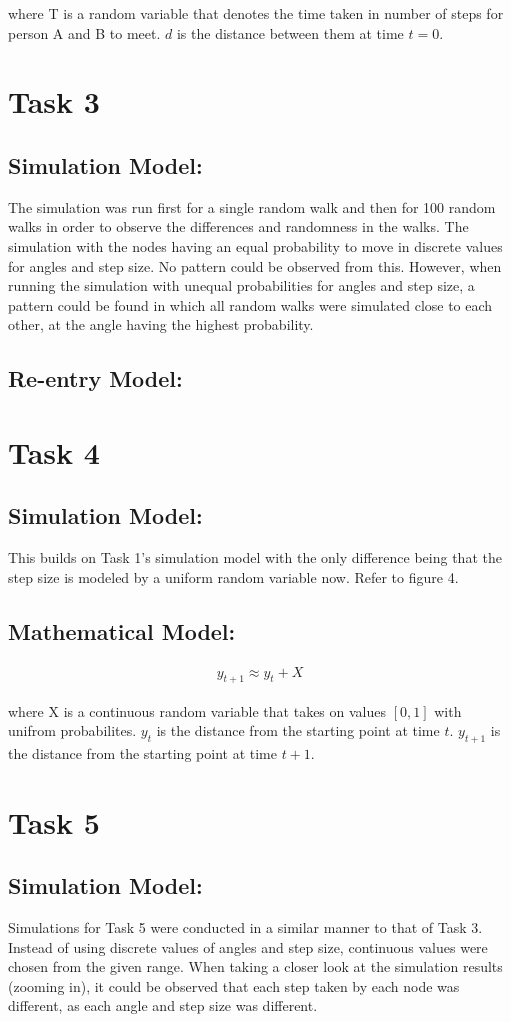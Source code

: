 \documentclass[8pt]{extarticle}
\begin{document}
where T is a random variable that denotes the time taken in number of steps for person A and B to meet.
$d$ is the distance between them at time $t = 0$.


\section*{Task 3}
\subsection*{Simulation Model:}
The simulation was run first for a single random walk and then for 100 random walks in order to observe the differences and randomness in the walks. The simulation with the nodes having an equal probability to move in discrete values for angles and step size. No pattern could be observed from this. However, when running the simulation with unequal probabilities for angles and step size, a pattern could be found in which all random walks were simulated close to each other, at the angle having the highest probability.

\subsection*{Re-entry Model:}


\section*{Task 4}
\subsection*{Simulation Model:}
This builds on Task 1's simulation model with the only difference being that the step size is modeled by a uniform random variable now.
Refer to figure 4.

\subsection*{Mathematical Model:}
\begin{align*}
    y_{t+1} \approx y_{t} + X
\end{align*}

where X is a continuous random variable that takes on values $[0, 1]$ with unifrom probabilites.
$y_t$ is the distance from the starting point at time $t$. $y_{t+1}$ is the distance from the starting point at time $t+1$.


\section*{Task 5}
\subsection*{Simulation Model:}
Simulations for Task 5 were conducted in a similar manner to that of Task 3. Instead of using discrete values of angles and step size, continuous values were chosen from the given range. When taking a closer look at the simulation results (zooming in), it could be observed that each step taken by each node was different, as each angle and step size was different.
\end{document}
